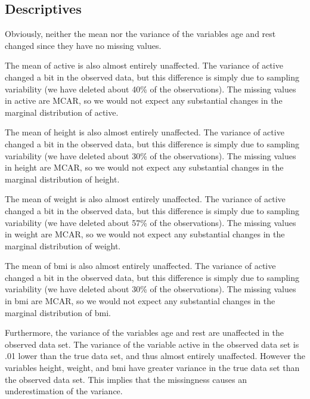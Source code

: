 \documentclass[
]{article}
\begin{document}
\hypertarget{data1}{%
\subsection{Descriptives}\label{data1}}

Obviously, neither the mean nor the variance of the variables age and rest changed since they have no missing values.

The mean of active is also almost entirely unaffected. The variance of active changed a bit in the observed data, but this difference is simply due to sampling variability (we have deleted about 40\% of the observations). The missing values in active are MCAR, so we would not expect any substantial changes in the marginal distribution of active.

The mean of height is also almost entirely unaffected. The variance of active changed a bit in the observed data, but this difference is simply due to sampling variability (we have deleted about 30\% of the observations). The missing values in height are MCAR, so we would not expect any substantial changes in the marginal distribution of height.

The mean of weight is also almost entirely unaffected. The variance of active changed a bit in the observed data, but this difference is simply due to sampling variability (we have deleted about 57\% of the observations). The missing values in weight are MCAR, so we would not expect any substantial changes in the marginal distribution of weight.

The mean of bmi is also almost entirely unaffected. The variance of active changed a bit in the observed data, but this difference is simply due to sampling variability (we have deleted about 30\% of the observations). The missing values in bmi are MCAR, so we would not expect any substantial changes in the marginal distribution of bmi.

Furthermore, the variance of the variables age and rest are unaffected in the observed data set. The variance of the variable active in the observed data set is .01 lower than the true data set, and thus almost entirely unaffected. However the variables height, weight, and bmi have greater variance in the true data set than the observed data set. This implies that the missingness causes an underestimation of the variance.
\end{document}
